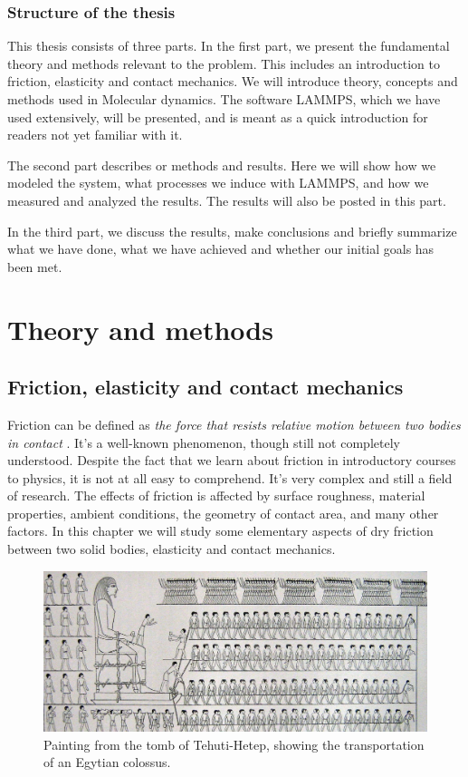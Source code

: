 \documentclass[twoside,english]{uiofysmaster}
\begin{document}
\section{Structure of the thesis}
This thesis consists of three parts. 
In the first part, we present the fundamental theory and methods relevant to the problem. 
This includes an introduction to friction, elasticity and contact mechanics.
We will introduce theory, concepts and methods used in Molecular dynamics. 
The software LAMMPS, which we have used extensively, will be presented, and is meant as a quick introduction for readers not yet familiar with it. 

The second part describes or methods and results.
Here we will show how we modeled the system, what processes we induce with LAMMPS, and how we measured and analyzed the results. 
The results will also be posted in this part.

In the third part, we discuss the results, make conclusions and briefly summarize what we have done, what we have achieved and whether our initial goals has been met.
    
	





\part{Theory and methods}


\chapter{Friction, elasticity and contact mechanics}
Friction can be defined as \textit{the force that resists relative motion between two bodies in contact} \cite{frictionDefinition}. 
It's a well-known phenomenon, though still not completely understood.
Despite the fact that we learn about friction in introductory courses to physics, it is not at all easy to comprehend. 
It's very complex and still a field of research.
The effects of friction is affected by surface roughness, material properties, ambient conditions, the geometry of contact area, and many other factors. 
In this chapter we will study some elementary aspects of dry friction between two solid bodies, elasticity and contact mechanics. 


\begin{figure}[H]
	\centering
	\includegraphics[width=0.99\linewidth]{figures/friction/Colossus.jpg}
	\caption{Painting from the tomb of Tehuti-Hetep, showing the transportation of an Egytian colossus.}
	\label{fig:Colossus}
\end{figure}
\end{document}
